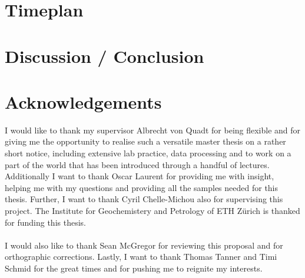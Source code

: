 \documentclass[a4paper,11pt,titlepage]{article}
\begin{document}
\section{Timeplan}

\section{Discussion / Conclusion}

\section{Acknowledgements}

I would like to thank my supervisor Albrecht von Quadt for being flexible and for giving me the opportunity to realise such a versatile master thesis on a rather short notice, including extensive lab practice, data processing and to work on a part of the world that has been introduced through a handful of lectures. Additionally I want to thank Oscar Laurent for providing me with insight, helping me with my questions and providing all the samples needed for this thesis. Further, I want to thank Cyril Chelle-Michou also for supervising this project. The Institute for Geochemistery and Petrology of ETH Zürich is thanked for funding this thesis.
\\
\\I would also like to thank Sean McGregor for reviewing this proposal and for orthographic corrections. Lastly, I want to thank Thomas Tanner and Timi Schmid for the great times and for pushing me to reignite my interests.
\end{document}
